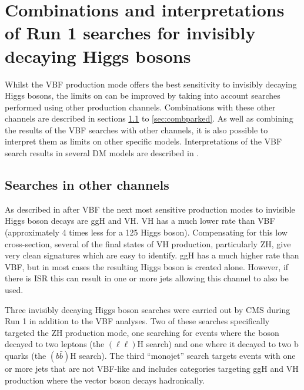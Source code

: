 \chapter{Combinations and interpretations of Run 1 searches for invisibly decaying Higgs bosons}
\label{chap:comb}
Whilst the \ac{VBF} production mode offers the best sensitivity to invisibly decaying Higgs bosons, the limits on \BRinv can be improved by taking into account searches performed using other production channels. Combinations with these other channels are described in sections \ref{sec:combotherchannels} to \ref{sec:combparked}. As well as combining the results of the \ac{VBF} searches with other channels, it is also possible to interpret them as limits on other specific models. Interpretations of the \ac{VBF} search results in several \ac{DM} models are described in .


\section{Searches in other channels}
\label{sec:combotherchannels}
As described in  after \ac{VBF} the next most sensitive production modes to invisible Higgs boson decays are \ac{ggH} and \ac{VH}. \ac{VH} has a much lower rate than \ac{VBF} (approximately 4 times less for a 125 \GeV Higgs boson). Compensating for this low cross-section, several of the final states of \ac{VH} production, particularly \ac{ZH}, give very clean signatures which are easy to identify. \ac{ggH} has a much higher rate than \ac{VBF}, but in most cases the resulting Higgs boson is created alone. However, if there is \ac{ISR} this can result in one or more jets allowing this channel to also be used. 

Three invisibly decaying Higgs boson searches were carried out by CMS during Run 1 in addition to the \ac{VBF} analyses. Two of these searches specifically targeted the \ac{ZH} production mode, one searching for events where the \PZ boson decayed to two leptons (the \PZ$(\ell\ell)$H search) and one where it decayed to two b quarks (the \PZ$(b\bar{b})$H search). The third ``monojet'' search targets events with one or more jets that are not \ac{VBF}-like and includes categories targeting \ac{ggH} and \ac{VH} production where the vector boson decays hadronically. 

